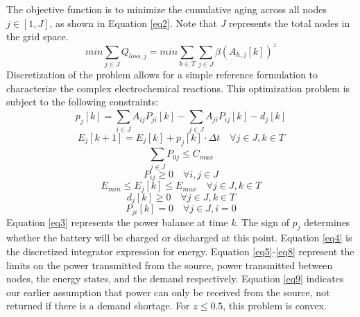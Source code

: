 \documentclass[10]{IEEEtran}
\begin{document}
	The objective function is to minimize the cumulative aging across all nodes $j\in[1,J]$, as shown in Equation \ref{eq2}. Note that \textit{J} represents the total nodes in the grid space.
	\begin{equation}\label{eq2}
	min\sum_{j\in J}^{}Q_{loss,j} = min\sum_{k\in T}^{}\sum_{j\in J}^{}\beta(A_{h,j}[k])^z
	\end{equation}
	Discretization of the problem allows for a simple reference formulation to characterize the complex electrochemical reactions. This optimization problem is subject to the following constraints:
	\begin{equation}\label{eq3}
	p_j[k] = \sum_{i\in J}^{}A_{ij}P_{ji}[k]-\sum_{j\in J}^{}A_{ji}P_{ij}[k]-d_j[k]
	\end{equation}
	\begin{equation}\label{eq4}
	E_j[k+1] = E_j[k] + p_j[k]\cdot\Delta t \quad \forall j\in J, k\in T
	\end{equation}
	\begin{equation}\label{eq5}
	\sum_{j\in J}^{}P_{0j} \leq C_{max}
	\end{equation}
	\begin{equation}\label{eq6}
	P_{ij} \geq 0 \quad \forall i,j\in J
	\end{equation}
	\begin{equation}\label{eq7}
	E_{min} \leq E_j[k] \leq E_{max} \quad \forall j\in J, k\in T
	\end{equation}
	\begin{equation}\label{eq8}
	d_j[k] \geq 0 \quad \forall j\in J, k\in T
	\end{equation}
	\begin{equation}\label{eq9}
	P_{ji}[k] = 0 \quad \forall j\in J, i=0
	\end{equation}
	Equation \ref{eq3} represents the power balance at time \textit{k}. The sign of $p_j$ determines whether the battery will be charged or discharged at this point. Equation \ref{eq4} is the discretized integrator expression for energy. Equation \ref{eq5}-\ref{eq8} represent the limits on the power transmitted from the source, power transmitted between nodes, the energy states, and the demand respectively. Equation \ref{eq9} indicates our earlier assumption that power can only be received from the source, not returned if there is a demand shortage.
	For $z\leq 0.5$, this problem is convex.  
	
\end{document}
